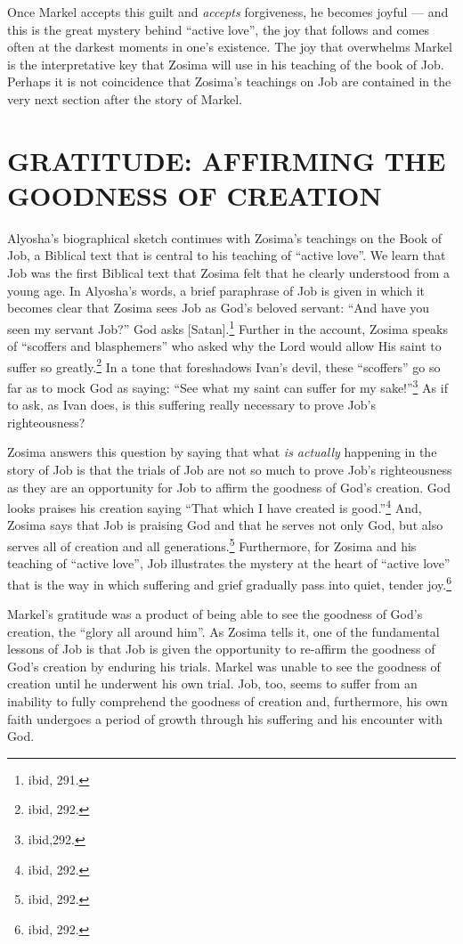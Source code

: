 	Once Markel accepts this guilt and \emph{accepts} forgiveness, he becomes joyful --- and this is the great mystery behind ``active love'', the joy that follows and comes often at the darkest moments in one's existence. The joy that overwhelms Markel is the interpretative key that Zosima will use in his teaching of the book of Job. Perhaps it is not coincidence that Zosima's teachings on Job are contained in the very next section after the story of Markel.
	
	
	\chapter{GRATITUDE: AFFIRMING THE GOODNESS OF CREATION}
	Alyosha's biographical sketch continues with Zosima's teachings on the Book of Job, a Biblical text that is central to his teaching of ``active love''. We learn that Job was the first Biblical text that Zosima felt that he clearly understood from a young age. In Alyosha's words, a brief paraphrase of Job is given in which it becomes clear that Zosima sees Job as God's beloved servant: ``And have you seen my servant Job?'' God asks [Satan].\footnote{ibid, 291.} Further in the account, Zosima speaks of ``scoffers and blasphemers'' who asked why the Lord would allow His saint to suffer so greatly.\footnote{ibid, 292.} In a tone that foreshadows Ivan's devil, these ``scoffers'' go so far as to mock God as saying: ``See what my saint can suffer for my sake!''\footnote{ibid,292.} As if to ask, as Ivan does, is this suffering really necessary to prove Job's righteousness?
	
	Zosima answers this question by saying that what \emph{is actually} happening in the story of Job is that the trials of Job are not so much to prove Job's righteousness as they are an opportunity for Job to affirm the goodness of God's creation. God looks praises his creation saying ``That which I have created is good.''\footnote{ibid, 292.} And, Zosima says that Job is praising God and that he serves not only God, but also serves all of creation and all generations.\footnote{ibid, 292.} Furthermore, for Zosima and his teaching of ``active love'', Job illustrates the mystery at the heart of ``active love'' that is the way in which suffering and grief gradually pass into quiet, tender joy.\footnote{ibid, 292.}
	
	Markel's gratitude was a product of being able to see the goodness of God's creation, the ``glory all around him''. As Zosima tells it, one of the fundamental lessons of Job is that Job is given the opportunity to re-affirm the goodness of God's creation by enduring his trials. Markel was unable to see the goodness of creation until he underwent his own trial. Job, too, seems to suffer from an inability to fully comprehend the goodness of creation and, furthermore, his own faith undergoes a period of growth through his suffering and his encounter with God.
	

